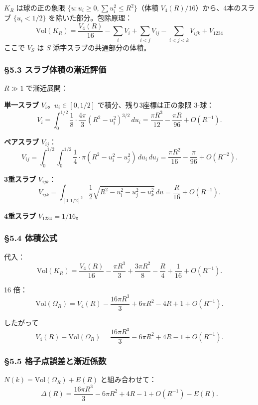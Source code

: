 \documentclass[a4paper,11pt]{ltjsarticle}
\theoremstyle{definition}
\begin{document}
\(K_R\) は球の正の象限 \(\{u : u_i \ge 0, \sum u_i^2 \le R^2\}\)（体積
\(V_4(R)/16\)）から、4本のスラブ \(\{u_i < 1/2\}\)
を除いた部分。包除原理：
\[\mathrm{Vol}(K_R) = \frac{V_4(R)}{16} - \sum_{i} V_i + \sum_{i<j} V_{ij} - \sum_{i<j<k} V_{ijk} + V_{1234}\]
ここで \(V_S\) は \(S\) 添字スラブの共通部分の体積。

\subsubsection{§5.3
スラブ体積の漸近評価}\label{ux30b9ux30e9ux30d6ux4f53ux7a4dux306eux6f38ux8fd1ux8a55ux4fa1}

\(R \gg 1\) で漸近展開：

\textbf{単一スラブ} \(V_i\)。\(u_i \in [0, 1/2]\)
で積分、残り3座標は正の象限 3-球：
\[V_i = \int_0^{1/2} \frac{1}{8} \cdot \frac{4\pi}{3} (R^2 - u_i^2)^{3/2}\, du_i = \frac{\pi R^3}{12} - \frac{\pi R}{96} + O(R^{-1}).\]

\textbf{ペアスラブ} \(V_{ij}\)：
\[V_{ij} = \int_0^{1/2}\int_0^{1/2} \frac{1}{4} \cdot \pi (R^2 - u_i^2 - u_j^2)\, du_i\, du_j = \frac{\pi R^2}{16} - \frac{\pi}{96} + O(R^{-2}).\]

\textbf{3重スラブ} \(V_{ijk}\)：
\[V_{ijk} = \int_{[0,1/2]^3} \frac{1}{2} \sqrt{R^2 - u_i^2 - u_j^2 - u_k^2}\, du = \frac{R}{16} + O(R^{-1}).\]

\textbf{4重スラブ} \(V_{1234} = 1/16\)。

\subsubsection{§5.4 体積公式}\label{ux4f53ux7a4dux516cux5f0f}

代入：
\[\mathrm{Vol}(K_R) = \frac{V_4(R)}{16} - \frac{\pi R^3}{3} + \frac{3\pi R^2}{8} - \frac{R}{4} + \frac{1}{16} + O(R^{-1}).\]

16 倍：
\[\boxed{\;\mathrm{Vol}(\Omega_R) = V_4(R) - \frac{16\pi R^3}{3} + 6\pi R^2 - 4 R + 1 + O(R^{-1}).\;}\]

したがって
\[V_4(R) - \mathrm{Vol}(\Omega_R) = \frac{16\pi R^3}{3} - 6\pi R^2 + 4R - 1 + O(R^{-1}).\]

\subsubsection{§5.5
格子点誤差と漸近係数}\label{ux683cux5b50ux70b9ux8aa4ux5deeux3068ux6f38ux8fd1ux4fc2ux6570}

\(N(k) = \mathrm{Vol}(\Omega_R) + E(R)\) と組み合わせて：
\[\Delta(R) = \frac{16\pi R^3}{3} - 6\pi R^2 + 4R - 1 + O(R^{-1}) - E(R).\]
\end{document}
